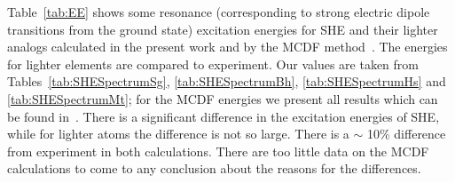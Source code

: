 \documentclass[10pt,a4paper, twoside, openright]{report}
\begin{document}
Table~\ref{tab:EE} shows some resonance (corresponding to strong electric dipole transitions from the ground state) excitation energies for SHE and their lighter analogs calculated in the present work and by the MCDF method~\cite{MCDF-Sg,MCDF-BhHs}. The energies for lighter elements are compared to experiment. Our values are taken from Tables~\ref{tab:SHESpectrumSg}, \ref{tab:SHESpectrumBh}, \ref{tab:SHESpectrumHs} and \ref{tab:SHESpectrumMt}; for the MCDF energies we present all results which can be found in~\cite{MCDF-Sg,MCDF-BhHs}. There is  a significant difference in the excitation energies of SHE, while for lighter atoms the difference is not so large. There is a $\sim$ 10\% difference from experiment in both calculations. There are too little data on the MCDF calculations to come to any conclusion about the reasons for the differences. %
\end{document}
